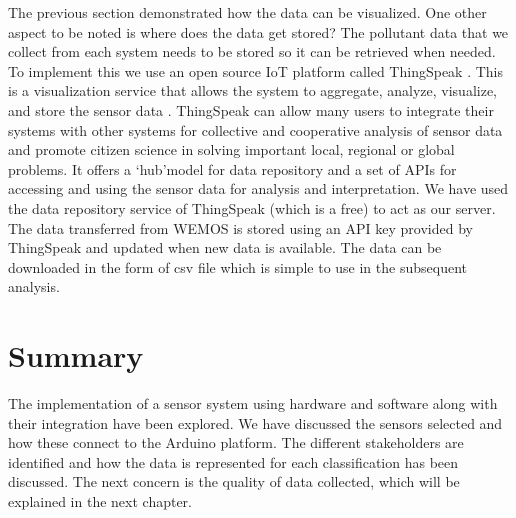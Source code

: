 The previous section demonstrated how the data can be visualized. One other aspect to be noted is where does the data get stored? The pollutant data that we collect from each system needs to be stored so it can be retrieved when needed. To implement this we use an open source IoT platform called ThingSpeak \cite{thingspeak}. This is a visualization service that allows the system to aggregate, analyze, visualize, and store the sensor data \cite{thingspeak}. ThingSpeak can allow many users to integrate their systems with other systems for collective and cooperative analysis of sensor data and promote citizen science in solving important local, regional or global problems. It offers a \lq{hub}\rq model for data repository and a set of APIs for accessing and using the sensor data for analysis and interpretation. We have used the data repository service of ThingSpeak (which is a free) to act as our server. The data transferred from WEMOS is stored using an API key provided by ThingSpeak and updated when new data is available. The data can be downloaded in the form of csv file which is simple to use in the subsequent analysis.

\section{Summary}

The implementation of a sensor system using hardware and software along with their integration have been explored. We have discussed the sensors selected and how these connect to the Arduino platform. The different stakeholders are identified and how the data is represented for each classification has been discussed. The next concern is the quality of data collected, which will be explained in the next chapter.

